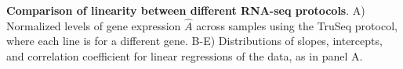 \label{fig:fithists} \textbf{Comparison of linearity between different RNA-seq protocols}.  A) Normalized levels of gene expression $\hat{A}$ across samples using the TruSeq protocol, where each line is for a different gene.  B-E) Distributions of slopes, intercepts, and correlation coefficient for linear regressions of the data, as in panel A. 

